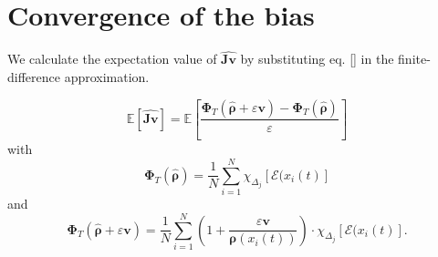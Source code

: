\documentclass[]{article}
\newcommand{\E}{\ensuremath{\mathbb{E}}}
\newcommand{\U}{\ensuremath{\boldsymbol{\rho}}}
\newcommand{\cts}{\ensuremath{\boldsymbol{\Phi}_T}} %
\newcommand{\V}{\ensuremath{\mathbf{v}}}
\newcommand{\jv}{\ensuremath{\mathbf{\hat{Jv}}}}
\begin{document}
%

%
%
%






%


\section{Convergence of the bias}
We calculate the expectation value of $\jv$ by substituting eq. \eqref{} in the finite-difference approximation.

\begin{equation}
\E[\jv] =  \E \left[ \frac{\cts (\hat{\U} + \varepsilon \mathbf{v} )  - \cts (\hat{\U})}{\varepsilon}  \right]
\end{equation}
with \begin{equation}
\cts (\hat{\U})  = \frac{1}{N}\sum_{i=1}^{N} \chi_{\Delta_j} \left[\mathcal{E} (x_i(t) \right]
\end{equation}
and 
\begin{equation}
\cts (\hat{\U} + \varepsilon \V )  = \frac{1}{N}\sum_{i=1}^{N}  (1+ \frac{\varepsilon \V}  {\U(x_i(t))}  ) \cdot \chi_{\Delta_j} \left[\mathcal{E} (x_i(t) \right] .
\end{equation}
\end{document}
